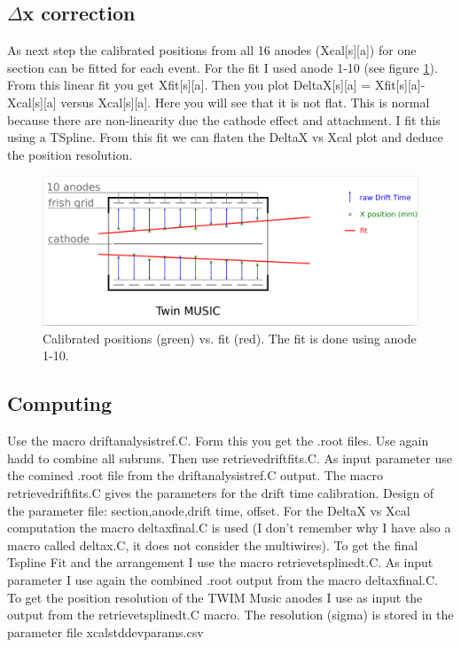 \documentclass{report}
\begin{document}
\subsection{$\Delta$x correction}
As next step the calibrated positions from all 16 anodes (Xcal[s][a]) for one section can be fitted for each event. For the fit I used anode 1-10 (see figure \ref{fig:anodes_pos_fit}).\newline 
From this linear fit you get Xfit[s][a].\newline
Then you plot DeltaX[s][a] = Xfit[s][a]-Xcal[s][a] versus Xcal[s][a].\newline
Here you will see that it is not flat. This is normal because there are non-linearity due the cathode effect and attachment. I fit this using a TSpline. From this fit we can flaten the DeltaX vs Xcal plot and deduce the position resolution.
\begin{figure}[!htb]
  \includegraphics[width=\linewidth]{twim_fit_anodes.png}
	\caption{Calibrated positions (green) vs. fit (red). The fit is done using anode 1-10.}
  \label{fig:anodes_pos_fit}
\end{figure}
\subsection{Computing}
Use the macro \dq drift\textunderscore analysis\textunderscore tref.C\dq{}. Form this you get the .root files. Use again \dq hadd\dq{} to combine all subruns. Then use retrieve\textunderscore drift\textunderscore fits.C. As input parameter use the comined .root file from the drift\textunderscore analysis\textunderscore tref.C output. The macro retrieve\textunderscore drift\textunderscore fits.C gives the parameters for the drift time calibration. \newline
Design of the parameter file: section,anode,drift time, offset.\newline
For the DeltaX vs Xcal computation the macro \dq delta\textunderscore x\textunderscore final.C\dq{} is used (I don't remember why I have also a macro called \dq delta\textunderscore x\textunderscoredrift.C\dq{}, it does not consider the multiwires).\newline
To get the final Tspline Fit and the arrangement I use the macro \dq retrieve\textunderscore tspline\textunderscore dt.C\dq{}. As input parameter I use again the combined .root output from the macro \dq delta\textunderscore x\textunderscore final.C\dq{}.\newline
To get the position resolution of the TWIM Music anodes I use as input the output from the \dq retrieve\textunderscore tspline\textunderscore dt.C\dq{} macro. The resolution (sigma) is stored in the parameter file \dq xcal\textunderscore std\textunderscore dev\textunderscore params.csv\dq{}
\end{document}

